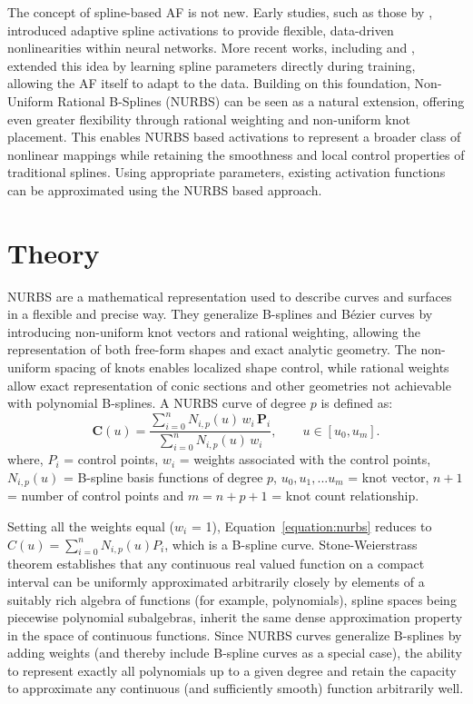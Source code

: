 \documentclass[manuscript, screen, review]{jair}
\begin{document}
The concept of spline-based AF is not new. Early studies, such as those by 
\cite{guarnieri1999multilayer}, introduced adaptive spline activations to provide flexible, 
data-driven nonlinearities within neural networks. 
More recent works, including \cite{hryniowski2018polyneuronautomaticneurondiscovery} and 
\cite{bohra2020learning}, extended this idea by learning spline parameters directly during training, 
allowing the AF itself to adapt to the data. 
Building on this foundation, Non-Uniform Rational B-Splines (NURBS) can be seen as a natural 
extension, offering even greater flexibility through rational weighting and non-uniform knot placement. 
This enables NURBS based activations to represent a broader class of nonlinear mappings while 
retaining the smoothness and local control properties of traditional splines.
Using appropriate parameters, existing activation functions can be approximated using the NURBS based approach.

\section{Theory}
NURBS \cite{nurbs} are a mathematical representation used to describe curves and surfaces 
in a flexible and precise way. They generalize B-splines and Bézier \cite{Prautzsch2002Bezier} curves 
by introducing non-uniform knot vectors and rational weighting, 
allowing the representation of both free-form shapes and 
exact analytic geometry. The non-uniform spacing of knots enables localized shape control, 
while rational weights allow exact representation of conic sections 
and other geometries not achievable with polynomial B-splines.
A NURBS curve of degree $p$ is defined as:
\begin{equation}\label{equation:nurbs}
\mathbf{C}(u)=
\frac{
\displaystyle\sum_{i=0}^{n} N_{i,p}(u)\, w_i\, \mathbf{P}_i
}{
\displaystyle\sum_{i=0}^{n} N_{i,p}(u)\, w_i
},
\qquad u \in [u_0, u_m].
\end{equation}
where, $P_i$ = control points, $w_i$ = weights associated with the control points, 
$N_{i,p}(u)$ = B-spline basis functions of degree $p$, ${u_0, u_1,...u_m}$ = knot vector, 
$n + 1$ = number of control points and $m = n + p + 1$ = knot count relationship.

Setting all the weights equal ($w_i$ = 1), Equation~\ref{equation:nurbs} reduces to 
$C(u) = \displaystyle\sum_{i=0}^{n} N_{i,p}(u)P_i$, which is a B-spline curve.
Stone-Weierstrass theorem \cite{stone1948generalized} establishes that any continuous real valued 
function on a compact interval can be uniformly approximated arbitrarily 
closely by elements of a suitably rich algebra of functions 
(for example, polynomials), spline spaces being piecewise polynomial 
subalgebras, inherit the same dense approximation property 
in the space of continuous functions. Since NURBS curves 
generalize B-splines by adding weights 
(and thereby include B-spline curves as a special case), the ability to represent exactly all 
polynomials up to a given degree and retain the capacity to approximate any 
continuous (and sufficiently smooth) function arbitrarily well.
\end{document}
